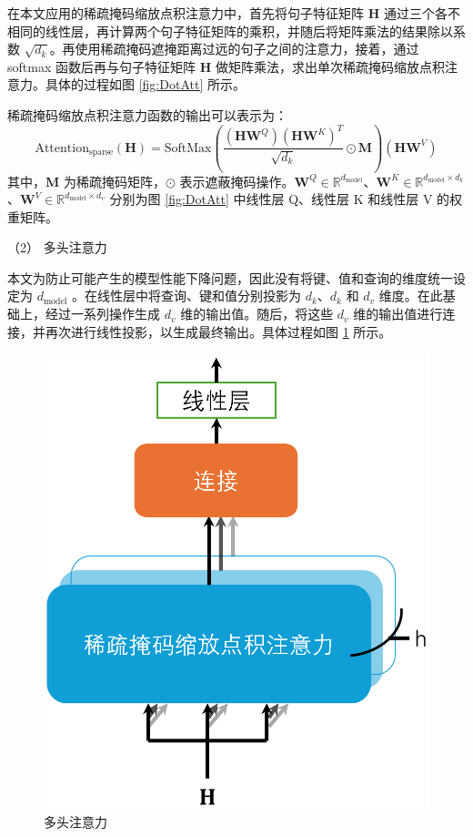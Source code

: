 在本文应用的稀疏掩码缩放点积注意力中，首先将句子特征矩阵 \( \textbf{H} \) 通过三个各不相同的线性层，再计算两个句子特征矩阵的乘积，并随后将矩阵乘法的结果除以系数 \(\sqrt{d_k}\)。再使用稀疏掩码遮掩距离过远的句子之间的注意力，接着，通过 softmax 函数后再与句子特征矩阵 \( \textbf{H} \) 做矩阵乘法，求出单次稀疏掩码缩放点积注意力。具体的过程如图 \ref{fig:DotAtt} 所示。

稀疏掩码缩放点积注意力函数的输出可以表示为：
\begin{equation}
\text{Attention}_\text{sparse}(\textbf{H}) = \text{SoftMax} \left( \frac{(\textbf{HW}^Q)(\textbf{HW}^K)^T}{\sqrt{d_k}} \odot \textbf{M} \right) (\textbf{HW}^V)
\label{eq3.1}
\end{equation}
其中，\(\textbf{M}\) 为稀疏掩码矩阵，\(\odot\) 表示遮蔽掩码操作。\(\textbf{W}^Q \in \mathbb{R}^{d_{\text{model}}}\)、\(\textbf{W}^K \in \mathbb{R}^{d_{\text{model}} \times d_k}\)、\(\textbf{W}^V \in \mathbb{R}^{d_{\text{model}} \times d_v}\) 分别为图 \ref{fig:DotAtt} 中线性层 Q、线性层 K 和线性层 V 的权重矩阵。

（2） 多头注意力

本文为防止可能产生的模型性能下降问题，因此没有将键、值和查询的维度统一设定为 \(d_{\text{model}}\) 。在线性层中将查询、键和值分别投影为 \(d_k\)、\(d_k\) 和 \(d_v\) 维度。在此基础上，经过一系列操作生成 \(d_v\) 维的输出值。随后，将这些 \(d_v\) 维的输出值进行连接，并再次进行线性投影，以生成最终输出。具体过程如图 \ref{fig:MultiheadAtt} 所示。

\begin{figure}[htbp]
	\centering
	\includegraphics[scale = 0.4]{figures/MultiheadAtt}
	\caption{多头注意力 \cite{transformer}}
	\label{fig:MultiheadAtt}
\end{figure}

